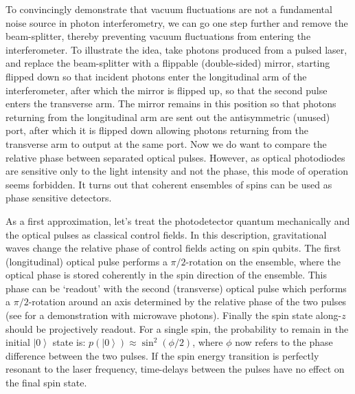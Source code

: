 \documentclass[reqno]{amsart}
\newcommand{\ket}[1]{\left| #1 \right>}
\begin{document}
To convincingly demonstrate that vacuum fluctuations are not a fundamental noise source in photon interferometry, we can go one step further and remove the beam-splitter, thereby preventing vacuum fluctuations from entering the interferometer. %
To illustrate the idea, take photons produced from a pulsed laser, and replace the beam-splitter with a flippable (double-sided) mirror, starting flipped down so that incident photons enter the longitudinal arm of the interferometer, after which the mirror is flipped up, so that the second pulse enters the transverse arm. The mirror remains in this position so that photons returning from the longitudinal arm are sent out the antisymmetric (unused) port, after which it is flipped down allowing photons returning from the transverse arm to output at the same port. Now we do want to compare the relative phase between separated optical pulses. %
However, as optical photodiodes are sensitive only to the light intensity and not the phase, this mode of operation seems forbidden. It turns out that coherent ensembles of spins can be used as phase sensitive detectors.

As a first approximation, let's treat the photodetector quantum mechanically and the optical pulses as classical control fields. In this description, gravitational waves change the relative phase of control fields acting on spin qubits. The first (longitudinal) optical pulse performs a $\pi/2$-rotation on the ensemble, where the optical phase is stored coherently in the spin direction of the ensemble. This phase can be `readout' with the second (transverse) optical pulse which performs a $\pi/2$-rotation around an axis determined by the relative phase of the two pulses (see \cite{McGuinness2021a} for a demonstration with microwave photons). Finally the spin state along-$z$ should be projectively readout. For a single spin, the probability to remain in the initial $\ket{0}$ state is: $p(\ket{0}) \approx \sin^2(\phi/2)$, where $\phi$ now refers to the phase difference between the two pulses. If the spin energy transition is perfectly resonant to the laser frequency, time-delays between the pulses have no effect on the final spin state. %
\end{document}
